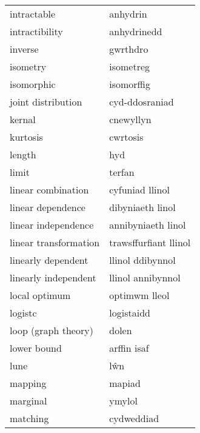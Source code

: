 \begin{supertabular}{p{0.22\textwidth}p{0.22\textwidth}}
                      intractable &                         anhydrin \\
                   intractibility &                      anhydrinedd \\
                          inverse &                         gwrthdro \\
                         isometry &                        isometreg \\
                       isomorphic &                       isomorffig \\
               joint distribution &                   cyd-ddosraniad \\
                           kernal &                        cnewyllyn \\
                         kurtosis &                         cwrtosis \\
                           length &                              hyd \\
                            limit &                           terfan \\
               linear combination &                  cyfuniad llinol \\
                linear dependence &                 dibyniaeth linol \\
              linear independence &               annibyniaeth linol \\
            linear transformation &            trawsffurfiant llinol \\
               linearly dependent &                 llinol ddibynnol \\
             linearly independent &                llinol annibynnol \\
                    local optimum &                    optimwm lleol \\
                          logistc &                       logistaidd \\
              loop (graph theory) &                            dolen \\
                      lower bound &                      arffin isaf \\
                             lune &                              lŵn \\
                          mapping &                           mapiad \\
                         marginal &                           ymylol \\
                         matching &                       cydweddiad \\

\end{supertabular}
